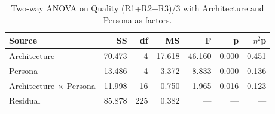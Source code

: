 \begin{table}[htbp]
\centering
\caption{Two-way ANOVA on Quality (R1+R2+R3)/3 with Architecture and Persona as factors.}
\label{tab:anova-quality}
\begin{tabular}{lrrrrrr}
\toprule
Source & SS & df & MS & F & p & $\eta$$^2$p \\
\midrule
Architecture & 70.473 & 4 & 17.618 & 46.160 & 0.000 & 0.451 \\
Persona & 13.486 & 4 & 3.372 & 8.833 & 0.000 & 0.136 \\
Architecture $\times$ Persona & 11.998 & 16 & 0.750 & 1.965 & 0.016 & 0.123 \\
Residual & 85.878 & 225 & 0.382 & --- & --- & --- \\
\bottomrule
\end{tabular}
\end{table}
